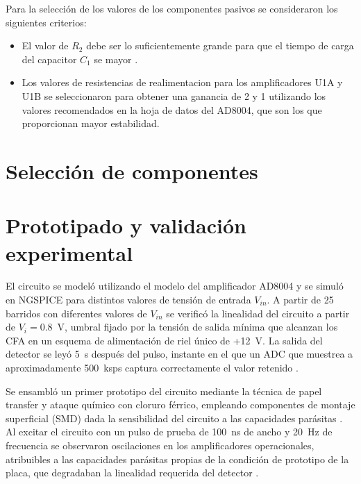 Para la selección de los valores de los componentes pasivos se consideraron los siguientes criterios:
\begin{itemize}
      \item El valor de $R_2$ debe ser lo suficientemente grande para que el tiempo de carga del capacitor $C_1$ se mayor .
      \item Los valores de resistencias de realimentacion para los amplificadores U1A y U1B se seleccionaron para obtener una ganancia de 2 y 1 utilizando los valores recomendados en la hoja de datos del AD8004, que son los que proporcionan mayor estabilidad.
\end{itemize}



\section{Selección de componentes}
\label{sec:seleccion_componentes_deteccion}



\section{Prototipado y validación experimental}
\label{sec:prototipado_validacion}


El circuito se modeló utilizando el modelo del amplificador AD8004 y se simuló en NGSPICE para distintos valores de tensión de entrada $V_{in}$. A partir de 25 barridos con diferentes valores de $V_{in}$ se verificó la linealidad del circuito a partir de $V_i = 0.8$~V, umbral fijado por la tensión de salida mínima que alcanzan los CFA en un esquema de alimentación de riel único de +12~V. La salida del detector se leyó 5~\textmu s después del pulso, instante en el que un ADC que muestrea a aproximadamente 500~ksps captura correctamente el valor retenido \cite{galvagno2026ilrc}.

Se ensambló un primer prototipo del circuito mediante la técnica de papel transfer y ataque químico con cloruro férrico, empleando
componentes de montaje superficial (SMD) dada la sensibilidad del circuito a las capacidades parásitas \cite{informeMarzo2026}. Al excitar
el circuito con un pulso de prueba de 100~ns de ancho y 20~Hz de frecuencia se observaron oscilaciones en los amplificadores
operacionales, atribuibles a las capacidades parásitas propias de la
condición de prototipo de la placa, que degradaban la linealidad
requerida del detector \cite{informeMarzo2026}.

